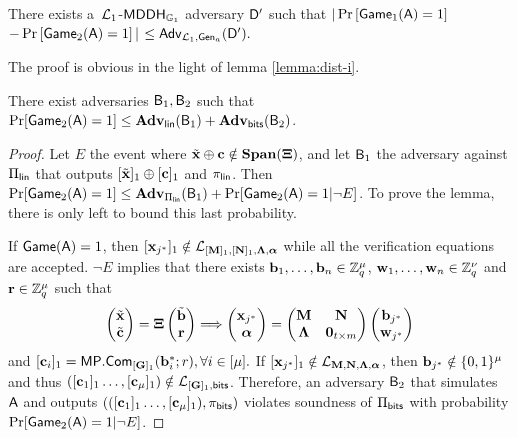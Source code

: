 \begin{lemma} There exists a\ $\mathcal{L}_1$-$\mathsf{MDDH}_{\mathbb{G}_1}$ adversary $\mathsf{D}'$ such that
$|\Pr\left[\mathsf{Game}_{1}(\mathsf{A})=1\right]$ $-\Pr\left[\mathsf{Game}_{2}(\mathsf{A})=1\right]|$ $\leq
    \mathsf{Adv}_{\mathcal{L}_1,\mathsf{Gen}_a}(\mathsf{D}').$
\end{lemma}

The proof is obvious in the light of lemma \ref{lemma:dist-i}. 
%

\begin{lemma}
There exist adversaries $\mathsf{B}_1,\mathsf{B}_2$ such that $\Pr[\mathsf{Game}_2(\mathsf{A})=1]\leq\mathbf{Adv}_{\mathsf{lin}}(\mathsf{B}_1)+\mathbf{Adv}_{\mathsf{bits}}(\mathsf{B}_2)$.
\end{lemma}

\begin{proof}
Let $E$ the event where ${\tilde{\mathbf{x}}}\oplus\mathbf{c}\notin\mathbf{Span}(\mathbf{{\Xi}})$, and let $\mathsf{B}_1$ the adversary against $\Pi_{\mathsf{lin}}$ that outputs $[{\tilde{\mathbf{x}}}]_1\oplus[\mathbf{c}]_1$ and $\pi_{\mathsf{lin}}$. Then $\Pr[\mathsf{Game}_2(\mathsf{A})=1]\leq\mathbf{Adv}_{\Pi_{\mathsf{lin}}}(\mathsf{B}_1)+\Pr[\mathsf{Game}_2(\mathsf{A})=1|\neg E]$.  To prove the lemma, there is only left to bound this last probability.

If $\mathsf{Game}(\mathsf{A})=1$, then $[\mathbf{x}_{j^*}]_1\notin \mathcal{L}_{[\mathbf{{M}}]_1,[\mathbf{{N}}]_1,\mathbf{{\Lambda}},{\boldsymbol \alpha}}$ while all the verification equations are accepted. $\neg E$ implies that there exists $\mathbf{b}_1,\ldots,\mathbf{b}_n\in\mathbb{Z}_q^{{\mu}}$, $\mathbf{w}_1,\ldots,\mathbf{w}_n\in\mathbb{Z}_q^{{\nu}}$ and $\mathbf{r}\in\mathbb{Z}_q^{\mu}$ such that
$$
\left(\begin{matrix}{\tilde{\mathbf{x}}}\\ {\tilde{\mathbf{c}}}\end{matrix}\right)=\mathbf{{\Xi}}
\left(\begin{matrix}{\tilde{\mathbf{b}}}\\\mathbf{r}\end{matrix}\right)
\Longrightarrow
\left(\begin{matrix}\mathbf{x}_{j^*}\\ {\boldsymbol \alpha}\end{matrix}\right)=
\begin{pmatrix}
    \mathbf{{M}}       & \mathbf{{N}}\\
    \mathbf{{\Lambda}} & \mathbf{{0}}_{t\times m}
\end{pmatrix}
\left(\begin{matrix}
    \mathbf{b}_{j^*}\\
    \mathbf{w}_{j^*}
\end{matrix}\right)
$$
 and $[\mathbf{{c}}_i]_1=\mathsf{MP}.\mathsf{Com}_{[\mathbf{{G}}]_1}(\mathbf{b}_i^*;r), \forall i\in[{\mu}].$
If $[\mathbf{x}_{j^*}]_1 \notin \mathcal{L}_{\mathbf{{M}},\mathbf{{N}},\mathbf{{\Lambda}},{\boldsymbol \alpha}}$, then $\mathbf{b}_{j^*}\notin\{0,1\}^{\mu}$ and thus $([\mathbf{c}_1]_1\ldots,[\mathbf{c}_{\mu}]_1)\notin\mathcal{L}_{[\mathbf{{G}}]_1,\mathsf{bits}}$. Therefore, an adversary $\mathsf{B}_2$ that simulates $\mathsf{A}$ and outputs $(([\mathbf{c}_1]_1\ldots,[\mathbf{c}_{\mu}]_1),\pi_{\mathsf{bits}})$ violates soundness of $\Pi_{\mathsf{bits}}$ with probability $\Pr[\mathsf{Game}_2(\mathsf{A})=1|\neg E]$.
\end{proof}

